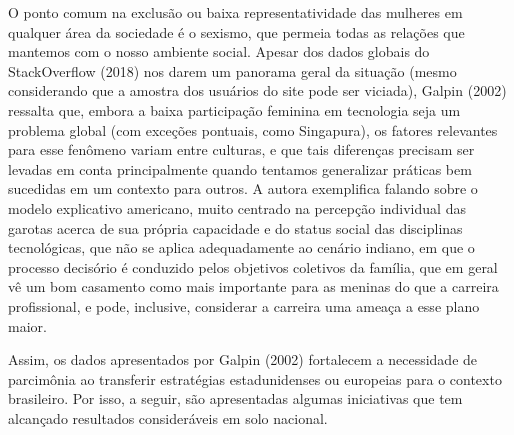O ponto comum na exclusão ou baixa representatividade das mulheres em qualquer área da sociedade é o sexismo, que permeia todas as relações que mantemos com o nosso ambiente social. Apesar dos dados globais do StackOverflow (2018) nos darem um panorama geral da situação (mesmo considerando que a amostra dos usuários do site pode ser viciada), Galpin (2002) ressalta que, embora a baixa participação feminina em tecnologia seja um problema global (com exceções pontuais, como Singapura), os fatores relevantes para esse fenômeno variam entre culturas, e que tais diferenças precisam ser levadas em conta principalmente quando tentamos generalizar práticas bem sucedidas em um contexto para outros. A autora exemplifica falando sobre o modelo explicativo americano, muito centrado na percepção individual das garotas acerca de sua própria capacidade e do status social das disciplinas tecnológicas, que não se aplica adequadamente ao cenário indiano, em que o processo decisório é conduzido pelos objetivos coletivos da família, que em geral vê um bom casamento como mais importante para as meninas do que a carreira profissional, e pode, inclusive, considerar a carreira uma ameaça a esse plano maior.

Assim, os dados apresentados por Galpin (2002) fortalecem a necessidade de parcimônia ao transferir estratégias estadunidenses ou europeias para o contexto brasileiro. Por isso, a seguir, são apresentadas algumas iniciativas que tem alcançado resultados consideráveis em solo nacional.

